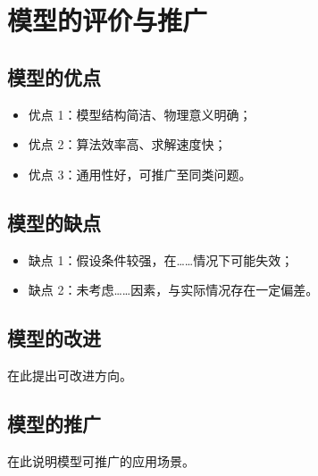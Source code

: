 \section{模型的评价与推广}

\subsection{模型的优点}
\begin{itemize}
  \item 优点 1：模型结构简洁、物理意义明确\cite{example2026}；
  \item 优点 2：算法效率高、求解速度快；
  \item 优点 3：通用性好，可推广至同类问题。
\end{itemize}

\subsection{模型的缺点}
\begin{itemize}
  \item 缺点 1：假设条件较强，在……情况下可能失效；
  \item 缺点 2：未考虑……因素，与实际情况存在一定偏差。
\end{itemize}

\subsection{模型的改进}
在此提出可改进方向。

\subsection{模型的推广}
在此说明模型可推广的应用场景。
